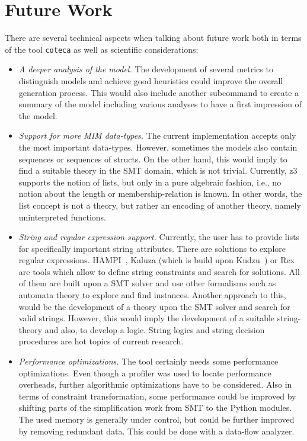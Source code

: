 \section{Future Work}

There are several technical aspects when talking about future work both in terms of the tool \verb|coteca| as well as scientific considerations:
\begin{itemize}
 \item \emph{A deeper analysis of the model.} The development of several metrics to distinguish models and achieve good heuristics could improve the overall generation process. This would also include another subcommand to create a summary of the model including various analyses to have a first impression of the model.
 
 \item \emph{Support for more MIM data-types.} The current implementation accepts only the most important data-types. However, sometimes the models also contain sequences or sequences of structs. On the other hand, this would imply to find a suitable theory in the SMT domain, which is not trivial. Currently, z3 supports the notion of lists, but only in a pure algebraic fashion, i.e., no notion about the length or membership-relation is known. In other words, the list concept is not a theory, but rather an encoding of another theory, namely uninterpreted functions.
 
 \item \emph{String and regular expression support.} Currently, the user has to provide lists for specifically important string attributes. There are solutions to explore regular expressions. HAMPI~\cite{hampi}, Kaluza (which is build upon Kudzu~\cite{kudzu}) or Rex~\cite{rex} are tools which allow to define string constraints and search for solutions. All of them are built upon a SMT solver and use other formalisms such as automata theory to explore and find instances. Another approach to this, would be the development of a theory upon the SMT solver and search for valid strings. However, this would imply the development of a suitable string-theory and also, to develop a logic. String logics and string decision procedures are hot topics of current research.
 
 \item \emph{Performance optimizations.} The tool certainly needs some performance optimizations. Even though a profiler was used to locate performance overheads, further algorithmic optimizations have to be considered. Also in terms of constraint transformation, some performance could be improved by shifting parts of the simplification work from SMT to the Python modules. The used memory is generally under control, but could be further improved by removing redundant data. This could be done with a data-flow analyzer.
 

\end{itemize}
